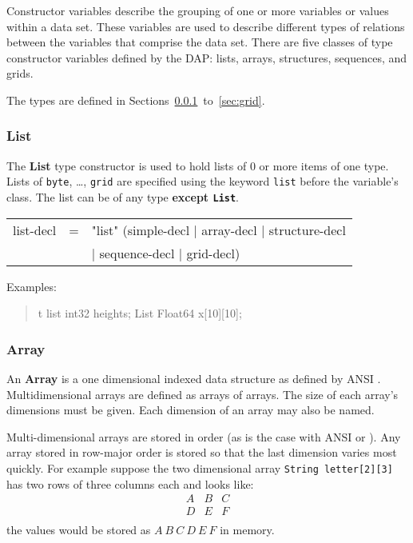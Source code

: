 Constructor variables describe the grouping of one or more variables or values
within a data set. These variables are used to describe different types of
relations between the variables that comprise the data set. There are five
classes of type constructor variables defined by the \ac{DAP}: lists, arrays,
structures, sequences, and grids. 

The types are defined in Sections~\ref{sec:list}~to~\ref{sec:grid}.

\subsubsection{List}
\label{sec:list}

 The \textbf{List} type constructor is used to hold lists of 0 or
  more items of one type. Lists of \texttt{byte}, \ldots, \texttt{grid} are
  specified using the keyword \texttt{list} before the variable's class. The
  list can be of any type \textbf{except \texttt{List}}.

\begin{ttfamily}
\begin{center}
\begin{tabular}{lll}
list-decl & = & "list" (simple-decl  | array-decl | structure-decl \\
          & & | sequence-decl | grid-decl) \\
\end{tabular}
\end{center}
\end{ttfamily}

Examples:
\begin{quote}
\begin{vcode}{t}
list int32 heights;
List Float64 x[10][10];
\end{vcode}
\end{quote}

\subsubsection{Array}
An \textbf{Array} is a one dimensional indexed data structure as defined by
ANSI \C. Multidimensional arrays are defined as arrays of arrays. The size of
each array's dimensions must be given. Each dimension of an array may also be
named.

Multi-dimensional arrays are stored in  order (as is
the case with ANSI \C or \Cpp). Any array stored in row-major order is stored
so that the last dimension varies most quickly. For example suppose the two
dimensional array \texttt{String letter[2][3]} has two rows of three columns
each and looks like:
\begin{displaymath}
\begin{array}{ccc}
A & B & C \\
D & E & F \\
\end{array}
\end{displaymath}
the values would be stored as $A~B~C~D~E~F$ in memory.

